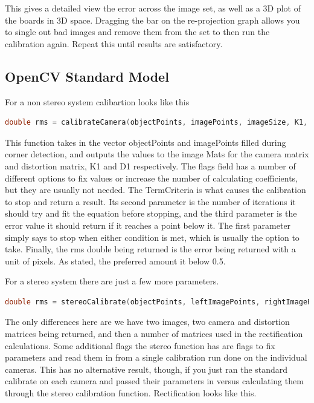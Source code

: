 \documentclass{article}
\begin{document}
This gives a detailed view the error across the image set, as well as a 3D plot of the boards in 3D space. Dragging the bar on the re-projection graph allows you to single out bad images and remove them from the set to then run the calibration again. Repeat this until results are satisfactory.

\subsection{OpenCV Standard Model}

For a non stereo system calibartion looks like this 

\begin{lstlisting}[language=C++, frame=single, breaklines]
double rms = calibrateCamera(objectPoints, imagePoints, imageSize, K1, D1, rvec, tvec, flags, TermCriteria(3,20,1e-6));
\end{lstlisting}

This function takes in the vector objectPoints and imagePoints filled during corner detection, and outputs the values to the image Mats for the camera matrix and distortion matrix, K1 and D1 respectively. The flags field has a number of different options to fix values or increase the number of calculating coefficients, but they are usually not needed. The TermCriteria is what causes the calibration to stop and return a result. Its second parameter is the number of iterations it should try and fit the equation before stopping, and the third parameter is the error value it should return if it reaches a point below it. The first parameter simply says to stop when either condition is met, which is usually the option to take. Finally, the rms double being returned is the error being returned with a unit of pixels. As stated, the preferred amount it below 0.5.

For a stereo system there are just a few more parameters. 

\begin{lstlisting}[language=C++, frame=single, breaklines]
double rms = stereoCalibrate(objectPoints, leftImagePoints, rightImagePoints, K1, D1, K2, D2, imageSize, R, T, E, F, flags, TermCriteria(2,20,1e-6));
\end{lstlisting}

The only differences here are we have two images, two camera and distortion matrices being returned, and then a number of matrices used in the rectification calculations. Some additional flags the stereo function has are flags to fix parameters and read them in from a single calibration run done on the individual cameras. This has no alternative result, though, if you just ran the standard calibrate on each camera and passed their parameters in versus calculating them through the stereo calibration function. Rectification looks like this. 
\end{document}
